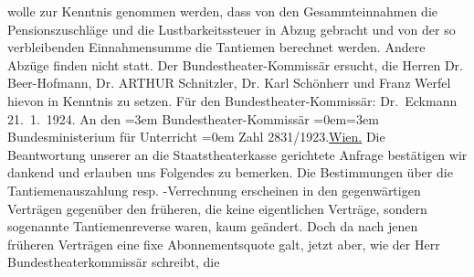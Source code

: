 \begin{ledgroupsized}[t]{13cm}
               wolle zur Kenntnis genommen werden, dass von den Gesammteinnahmen die
               Pensionszuschläge und die Lustbarkeitssteuer in Abzug gebracht und von der so
               verbleibenden Einnahmensumme die Tantiemen berechnet werden. Andere Abzüge finden
               nicht statt.\pend
           \pstart
           Der Bundestheater-Kommissär
               ersucht, die Herren Dr. Beer-Hofmann, Dr. ARTHUR Schnitzler,
               Dr. Karl Schönherr und Franz Werfel hievon in Kenntnis zu setzen.\pend
           \pstart
           Für den Bundestheater-Kommissär: \spacefill\mbox{Dr. Eckmann}\pend
           {\bigskip}\pstart
           \raggedleft{}{\pb}21. 1. 1924.\pend
           \pstart
           An den\pend
           \leftskip=3em{}\pstart
           \noindent{}Bundestheater-Kommissär\pend
           \leftskip=0em{}\leftskip=3em{}\pstart
           Bundesministerium für Unterricht\pend
           \leftskip=0em{}\pstart
           \noindent{}Zahl 2831/1923.\hfill \uline{Wien.}\pend
           \pstart
           Die Beantwortung unserer an die Staatstheaterkasse gerichtete Anfrage bestätigen wir dankend und erlauben
               uns Folgendes zu bemerken.\pend
           \pstart
           Die Bestimmungen über die Tantiemenauszahlung resp. -Verrechnung erscheinen in den
               gegenwärtigen Verträgen gegenüber den früheren, die keine eigentlichen Verträge,
               sondern sogenannte Tantiemenreverse waren, kaum geändert. Doch da nach jenen früheren
               Verträgen eine fixe Abonnementsquote galt, jetzt aber, wie der Herr Bundestheaterkommissär schreibt, die

\end{ledgroupsized}
